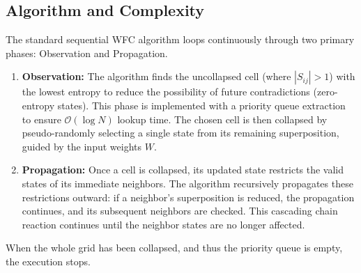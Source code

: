\subsection{Algorithm and Complexity}
The standard sequential WFC algorithm loops continuously through two primary phases: Observation and Propagation.

\begin{enumerate}
    \item \textbf{Observation:} The algorithm finds the uncollapsed cell (where $|S_{ij}| > 1$) with the lowest entropy to reduce the possibility of future contradictions (zero-entropy states). This phase is implemented with a priority queue extraction to ensure $\mathcal{O}(\log N)$ lookup time. The chosen cell is then collapsed by pseudo-randomly selecting a single state from its remaining superposition, guided by the input weights $W$.
    
    \item \textbf{Propagation:} Once a cell is collapsed, its updated state restricts the valid states of its immediate neighbors. The algorithm recursively propagates these restrictions outward: if a neighbor's superposition is reduced, the propagation continues, and its subsequent neighbors are checked. This cascading chain reaction continues until the neighbor states are no longer affected.
\end{enumerate}

When the whole grid has been collapsed, and thus the priority queue is empty, the execution stops.

